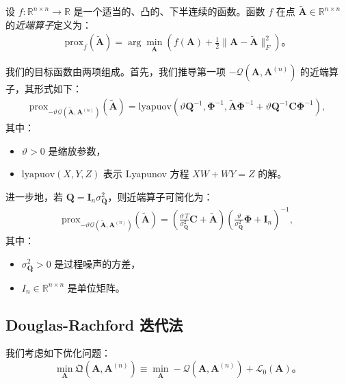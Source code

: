 设 \( f: \mathbb{R}^{n \times n} \to \mathbb{R} \) 是一个适当的、凸的、下半连续的函数。函数 \( f \) 在点 \(\tilde{\mathbf{A}} \in \mathbb{R}^{n \times n}\) 的\textit{近端算子}定义为：
\begin{align}
    \text{prox}_{f}(\tilde{\mathbf{A}}) = \arg\min_{\mathbf{A}} \left( f(\mathbf{A}) + \frac{1}{2} \| \mathbf{A} - \tilde{\mathbf{A}} \|^2_F \right)。
\end{align}

我们的目标函数由两项组成。首先，我们推导第一项 \(-\mathcal{Q}(\mathbf{A}, \mathbf{A}^{(n)})\) 的近端算子，其形式如下：
\begin{align}
    \mathrm{prox}_{-\vartheta\mathcal{Q}(\tilde{\mathbf{A}}, \mathbf{A}^{(n)})} (\tilde{\mathbf{A}}) = \mathrm{lyapuov} \left( \vartheta \mathbf{Q}^{-1}, \boldsymbol{\Phi}^{-1}, \tilde{\mathbf{A}} \boldsymbol{\Phi}^{-1} + \vartheta \mathbf{Q}^{-1} \mathbf{C} \boldsymbol{\Phi}^{-1} \right),
\end{align}
其中：
\begin{itemize}
    \item \(\vartheta > 0\) 是缩放参数，
    \item \(\mathrm{lyapuov}(X, Y, Z)\) 表示 Lyapunov 方程 \(XW + WY = Z\) 的解。
\end{itemize}

进一步地，若 \(\mathbf{Q} = \mathbf{I}_{n} \sigma^2_{\mathbf{Q}}\)，则近端算子可简化为：
\begin{align}
    \mathrm{prox}_{-\vartheta\mathcal{Q}(\tilde{\mathbf{A}}, \mathbf{A}^{(n)})} (\tilde{\mathbf{A}}) = \left( \frac{\vartheta\, T}{\sigma^2_{\mathbf{Q}}} \mathbf{C} + \tilde{\mathbf{A}} \right) \left( \frac{\vartheta}{\sigma^2_{\mathbf{Q}}} \boldsymbol{\Phi} + \mathbf{I}_{n} \right)^{-1},
\end{align}
其中：
\begin{itemize}
    \item \(\sigma^2_{\mathbf{Q}} > 0\) 是过程噪声的方差，
    \item \(I_{n} \in \mathbb{R}^{n \times n}\) 是单位矩阵。
\end{itemize}

\subsection{Douglas-Rachford 迭代法}

我们考虑如下优化问题：
\begin{equation}
    \min_{\mathbf{A}} \mathfrak{Q}(\mathbf{A}, \mathbf{A}^{(n)}) \equiv \min_{\mathbf{A}} -\mathcal{Q}(\mathbf{A}, \mathbf{A}^{(n)}) + \mathcal{L}_0(\mathbf{A})。
\end{equation}

